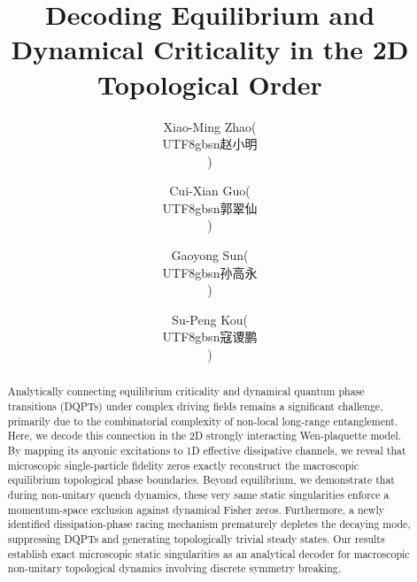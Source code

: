 \documentclass[aps,prb,floatfix,superscriptaddress,reprint]{revtex4-2}
\begin{document}
\title{Decoding Equilibrium and Dynamical Criticality in the 2D Topological Order}
\author{Xiao-Ming Zhao(\begin{CJK*}{UTF8}{gbsn}赵小明\end{CJK*})}
\author{Cui-Xian Guo(\begin{CJK*}{UTF8}{gbsn}郭翠仙\end{CJK*})}
\author{Gaoyong Sun(\begin{CJK*}{UTF8}{gbsn}孙高永\end{CJK*})}
\author{Su-Peng Kou(\begin{CJK*}{UTF8}{gbsn}寇谡鹏\end{CJK*})}


\begin{abstract}
Analytically connecting equilibrium criticality and dynamical quantum phase transitions (DQPTs) under complex driving fields remains a significant challenge, primarily due to the combinatorial complexity of non-local long-range entanglement. Here, we decode this connection in the 2D strongly interacting Wen-plaquette model. By mapping its anyonic excitations to 1D effective dissipative channels, we reveal that microscopic single-particle fidelity zeros exactly reconstruct the macroscopic equilibrium topological phase boundaries. Beyond equilibrium, we demonstrate that during non-unitary quench dynamics, these very same static singularities enforce a momentum-space exclusion against dynamical Fisher zeros. Furthermore, a newly identified dissipation-phase racing mechanism prematurely depletes the decaying mode, suppressing DQPTs and generating topologically trivial steady states. Our results establish exact microscopic static singularities as an analytical decoder for macroscopic non-unitary topological dynamics involving discrete symmetry breaking.
\end{abstract}
\end{document}
